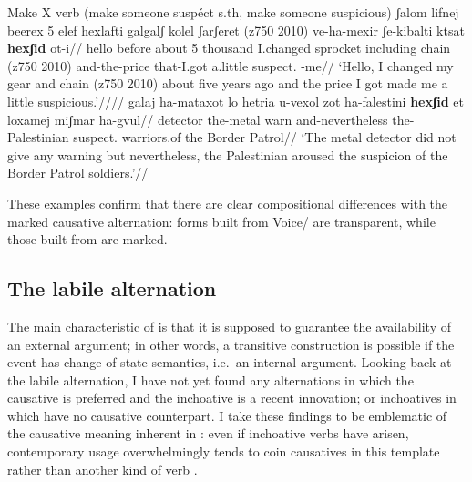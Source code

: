 \pex Make X verb (make someone suspéct s.th, make someone suspicious)
	\a \begingl
		\gla ʃalom lifnej beerex 5 elef hexlafti galgalʃ kolel ʃarʃeret (z750 2010) ve-ha-mexir ʃe-kibalti k{ts}at \textbf{hexʃid} ot-i//
		\glb hello before about 5 thousand I.changed sprocket including chain (z750 2010) and-the-price that-I.got a.little suspect. -me//
		\glft `Hello, I changed my gear and chain (z750 2010) about five years ago and the price I got made me a little suspicious.'////
	\endgl
	\a \begingl
		\gla galaj ha-mataxot lo hetria u-{vexol zot} ha-falestini \textbf{hexʃid} et loxamej {miʃmar ha-gvul}//
		\glb detector the-metal  warn and-nevertheless the-Palestinian suspect.  warriors.of {the Border Patrol}//
		\glft `The metal detector did not give any warning but nevertheless, the Palestinian aroused the suspicion of the Border Patrol soldiers.'//
	\endgl
\xe

These examples confirm that there are clear compositional differences with the marked causative alternation: forms built from Voice/{\vz} are transparent, while those built from {\vd} are marked.


%	
%	
%	
%


	\subsection{The labile alternation} \label{vd:caus:labile}
The main characteristic of {\vd} is that it is supposed to guarantee the availability of an external argument; in other words, a transitive construction is possible if the event has change-of-state semantics, i.e.~an internal argument. Looking back at the labile alternation, I have not yet found any alternations in which the causative is preferred and the inchoative is a recent innovation; or inchoatives in {\thif} which have no causative counterpart. I take these findings to be emblematic of the causative meaning inherent in {\vd}: even if inchoative verbs have arisen, contemporary usage overwhelmingly tends to coin causatives in this template rather than another kind of verb \citep{laks14}.

